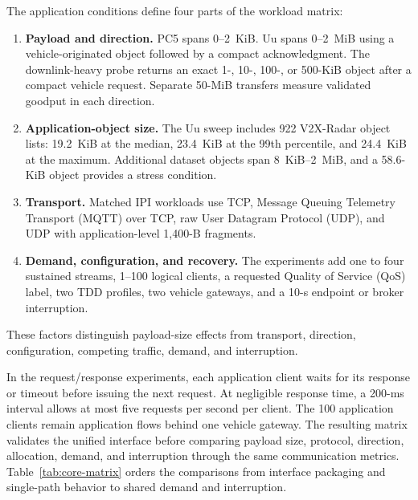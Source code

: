 The application conditions define four parts of the workload matrix:
\begin{enumerate}
  \renewcommand{\labelenumi}{\arabic{enumi})}
  \item \textbf{Payload and direction.} PC5 spans 0--2~KiB. Uu spans
  0--2~MiB using a vehicle-originated object followed by a compact
  acknowledgment. The downlink-heavy probe returns an exact 1-, 10-, 100-, or
  500-KiB object after a compact vehicle request. Separate 50-MiB transfers
  measure validated goodput in each direction.
  \item \textbf{Application-object size.} The Uu sweep includes 922 V2X-Radar
  object lists: 19.2~KiB at the median, 23.4~KiB at the 99th percentile, and
  24.4~KiB at the maximum. Additional dataset objects span 8~KiB--2~MiB, and a
  58.6-KiB object provides a stress condition.
  \item \textbf{Transport.} Matched IPI workloads use TCP, Message Queuing
  Telemetry Transport (MQTT) over TCP, raw User Datagram Protocol (UDP), and
  UDP with application-level 1,400-B fragments.
  \item \textbf{Demand, configuration, and recovery.} The experiments add one
  to four sustained streams, 1--100 logical clients, a requested Quality of
  Service (QoS) label, two TDD profiles, two vehicle gateways, and a 10-s
  endpoint or broker interruption.
\end{enumerate}
These factors distinguish payload-size effects from transport, direction,
configuration, competing traffic, demand, and interruption.

In the request/response experiments, each application client waits for its
response or timeout before issuing the
next request. At negligible response time, a 200-ms interval allows at most
five requests per second per client. The 100 application clients remain
application flows behind one vehicle gateway. The resulting matrix validates
the unified interface before comparing payload size, protocol, direction,
allocation, demand, and interruption through the same communication metrics.
Table~\ref{tab:core-matrix} orders the comparisons from interface packaging and
single-path behavior to shared demand and interruption.

